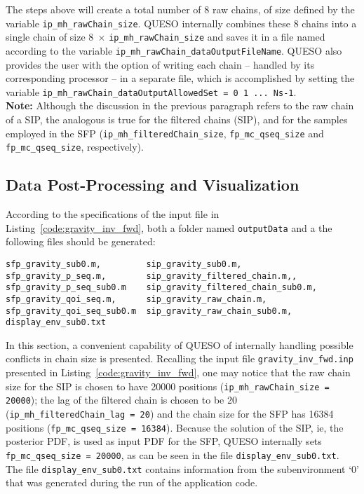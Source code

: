 The steps above will create a total number of 8 raw chains, of size defined by the variable \texttt{ip\_mh\_rawChain\_size}. QUESO internally combines these 8 chains into a single chain of size $8\; \times\,$\texttt{ip\_mh\_rawChain\_size} and saves it in a file named according to the variable \texttt{ip\_mh\_rawChain\_dataOutputFileName}.
QUESO also provides the user with the option of writing each chain -- handled by its corresponding processor -- in a separate file, which is accomplished by setting the variable \texttt{ip\_mh\_rawChain\_dataOutputAllowedSet = 0 1 ... Ns-1}.\\

\noindent
{\bf Note:} Although the discussion in the previous paragraph refers to the raw chain of a SIP, the analogous is true for the filtered chains (SIP), and for the samples employed in the SFP (\texttt{ip\_mh\_filteredChain\_size},    \texttt{fp\_mc\_qseq\_size} and \texttt{fp\_mc\_qseq\_size}, respectively).




\subsection{Data Post-Processing and Visualization}\label{sec:gravity-results}



According to the specifications of the input file in Listing~\ref{code:gravity_inv_fwd},
both a folder named \verb+outputData+ and a the following files should be generated:
\begin{verbatim}
sfp_gravity_sub0.m,         sip_gravity_sub0.m,
sfp_gravity_p_seq.m,        sip_gravity_filtered_chain.m,,
sfp_gravity_p_seq_sub0.m    sip_gravity_filtered_chain_sub0.m,
sfp_gravity_qoi_seq.m,      sip_gravity_raw_chain.m,
sfp_gravity_qoi_seq_sub0.m  sip_gravity_raw_chain_sub0.m,
display_env_sub0.txt
\end{verbatim}

In this section, a convenient capability of QUESO of internally handling possible conflicts in
chain size is presented. Recalling the input file \verb+gravity_inv_fwd.inp+ presented in
Listing~\ref{code:gravity_inv_fwd}, one may notice that  the raw chain size for the SIP is
chosen to have 20000 positions (\verb+ip_mh_rawChain_size = 20000+); the lag of the filtered chain
is chosen to be 20 (\verb+ip_mh_filteredChain_lag = 20+) and the chain size for the SFP has 16384
positions (\verb+fp_mc_qseq_size = 16384+). Because the solution of the SIP, ie, the posterior PDF,
is used as input PDF for the SFP, QUESO internally sets \verb+fp_mc_qseq_size = 20000+, as can be
seen in the file \verb+display_env_sub0.txt+.  The file \verb+display_env_sub0.txt+ contains information
from the subenvironment `0' that was generated during the run of the application code.

